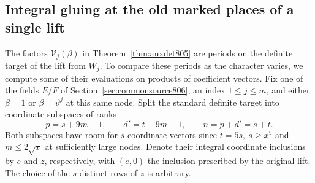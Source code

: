 \documentclass[a4paper,11pt]{article}
\theoremstyle{definition}
\theoremstyle{remark}
\numberwithin{equation}{section}
\begin{document}
\subsection{Integral gluing at the old marked places of a single lift}
\label{sec:integralgluing811}
The factors \(\mathcal V_j(\beta)\) in Theorem~\ref{thm:auxdet805}
are periods on the definite target of the lift from \(W_j\).
To compare these periods as the character varies, we compute some
of their evaluations on products of coefficient vectors. Fix one
of the fields \(E/F\) of Section~\ref{sec:commonsource806}, an
index \(1\le j\le m\), and either \(\beta=1\) or
\(\beta=\vartheta^j\) at this same node. Split the standard
definite target into coordinate subspaces of ranks
\[
             p=s+9m+1,\qquad d'=t-9m-1,\qquad n=p+d'=s+t .
\]
Both subspaces have room for \(s\) coordinate vectors since
\(t=5s,\ s\ge x^5\) and \(m\le2\sqrt{x}\) at sufficiently
large nodes. Denote their integral
coordinate inclusions by \(e\) and \(z\), respectively, with
\((e,0)\) the inclusion prescribed by the original lift. The
choice of the \(s\) distinct rows of \(z\) is arbitrary.
\end{document}
